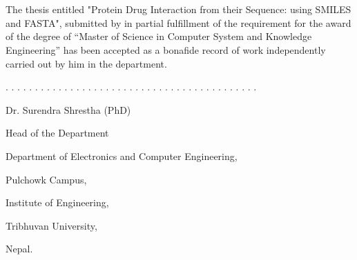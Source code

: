 \doublespacing
\iffalse

\chapter*{Recommendation}

The undersigned certify that they have read and recommended to the Department of Electronics and Computer Engineering for acceptance, a thesis entitled “\textit{\thetitle}”, submitted by {\theauthor} in partial fulfillment of the requirement for the award of the degree of “Master of Science in Computer System and Knowledge Engineering.

\vspace{3cm}
..........................................

Supervisor

Dr. Surendra Shrestha (PhD)

\vspace{3cm}


..........................................

External Examiner

Name:








\fi

\chapter*{}
\vspace{2.6cm} 

The thesis entitled "Protein Drug Interaction from their Sequence: using SMILES and FASTA", submitted by {\theauthor} in partial fulfillment of the requirement for the award of the degree of “Master of Science in Computer System and Knowledge Engineering” has been accepted as a bonafide record of work independently carried out by him in the department.


\vspace{3cm}
. . . . . . . . . . . . . . . . . . . . . . . . . . . . . . . . . . . . . . . . . . . 

Dr. Surendra Shrestha (PhD)

Head of the Department

Department of Electronics and Computer Engineering,

Pulchowk Campus,

Institute of Engineering,

Tribhuvan University,

Nepal.

